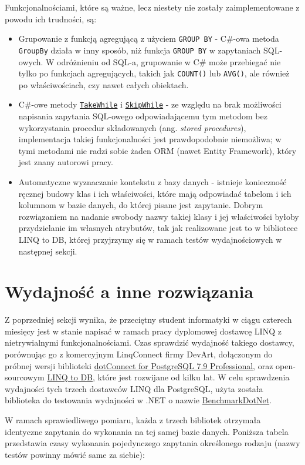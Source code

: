Funkcjonalnościami, które są ważne, lecz niestety nie zostały zaimplementowane z powodu ich trudności, są:

\begin{itemize}
\item Grupowanie z funkcją agregującą z użyciem \texttt{GROUP BY} - C\#-owa metoda \texttt{GroupBy} działa w inny sposób, niż funkcja \texttt{GROUP BY} w zapytaniach SQL-owych. W odróżnieniu od SQL-a, grupowanie w C\# może przebiegać nie tylko po funkcjach agregujących, takich jak \texttt{COUNT()} lub \texttt{AVG()}, ale również po właściwościach, czy nawet całych obiektach.
\item C\#-owe metody \href{https://msdn.microsoft.com/pl-pl/library/bb534804(v=vs.110).aspx}{\texttt{TakeWhile}} i \href{https://www.google.pl/url?sa=t&rct=j&q=&esrc=s&source=web&cd=1&cad=rja&uact=8&ved=0ahUKEwj43ai66LPUAhVCVhQKHSm4BfkQFggnMAA&url=https%3A%2F%2Fmsdn.microsoft.com%2Fpl-pl%2Flibrary%2Fbb549075(v%3Dvs.110).aspx&usg=AFQjCNHEbD9WVhCdEeCDPQw0CIt845i9Kg&sig2=41OZNQAxqA1IYG9QzuzK1g}{\texttt{SkipWhile}} - ze względu na brak możliwości napisania zapytania SQL-owego odpowiadającemu tym metodom bez wykorzystania procedur składowanych (ang. \textit{stored procedures}), implementacja takiej funkcjonalności jest prawdopodobnie niemożliwa; w tymi metodami nie radzi sobie żaden ORM (nawet Entity Framework), który jest znany autorowi pracy.
\item Automatyczne wyznaczanie kontekstu z bazy danych - istnieje konieczność ręcznej budowy klas i ich właściwości, które mają odpowiadać tabelom i ich kolumnom w bazie danych, do której pisane jest zapytanie. Dobrym rozwiązaniem na nadanie swobody nazwy takiej klasy i jej właściwości byłoby przydzielanie im własnych atrybutów, tak jak realizowane jest to w bibliotece LINQ to DB, której przyjrzymy się w ramach testów wydajnościowych w następnej sekcji.
\end{itemize}

\section{Wydajność a inne rozwiązania}
Z poprzedniej sekcji wynika, że przeciętny student informatyki w ciągu czterech miesięcy jest w stanie napisać w ramach pracy dyplomowej dostawcę LINQ z nietrywialnymi funkcjonalnościami. Czas sprawdzić wydajność takiego dostawcy, porównując go z komercyjnym LinqConnect firmy DevArt, dołączonym do próbnej wersji biblioteki \href{https://www.devart.com/dotconnect/postgresql/}{dotConnect for PostgreSQL 7.9 Professional}, oraz open-sourcowym \href{https://github.com/linq2db/linq2db}{LINQ to DB}, które jest rozwijane od kilku lat. W celu sprawdzenia wydajności tych trzech dostawców LINQ dla PostgreSQL, użyta została biblioteka do testowania wydajności w .NET o nazwie \href{https://github.com/dotnet/BenchmarkDotNet}{BenchmarkDotNet}.

W ramach sprawiedliwego pomiaru, każda z trzech bibliotek otrzymała identyczne zapytania do wykonania na tej samej bazie danych. Poniższa tabela przedstawia czasy wykonania pojedynczego zapytania określonego rodzaju (nazwy testów powinny mówić same za siebie):


